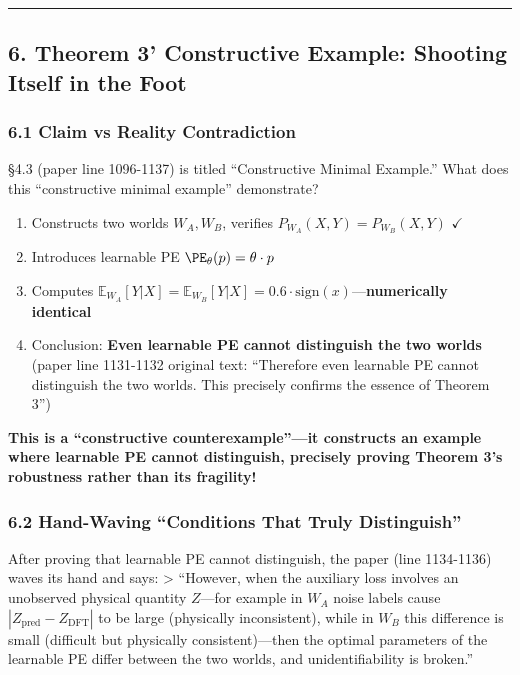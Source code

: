 \documentclass[
  12pt,
]{article}
\providecommand{\tightlist}{%
  \setlength{\itemsep}{0pt}\setlength{\parskip}{0pt}}
\begin{document}
\begin{center}\rule{0.5\linewidth}{0.5pt}\end{center}

\subsection{6. Theorem 3' Constructive Example: Shooting Itself in the Foot}\label{theorem-3-prime-example}

\subsubsection{6.1 Claim vs Reality Contradiction}\label{claim-vs-reality}

\S4.3 (paper line 1096-1137) is titled ``Constructive Minimal Example.'' What does this ``constructive minimal example'' demonstrate?

\begin{enumerate}
\def\labelenumi{\arabic{enumi}.}
\tightlist
\item
  Constructs two worlds \(W_A, W_B\), verifies \(P_{W_A}(X,Y) = P_{W_B}(X,Y)\) $\checkmark$
\item
  Introduces learnable PE \(\PE_\theta(p) = \theta \cdot p\)
\item
  Computes \(\mathbb{E}_{W_A}[Y|X] = \mathbb{E}_{W_B}[Y|X] = 0.6 \cdot \text{sign}(x)\)---\textbf{numerically identical}
\item
  Conclusion: \textbf{Even learnable PE cannot distinguish the two worlds} (paper line 1131-1132 original text: ``Therefore even learnable PE cannot distinguish the two worlds. This precisely confirms the essence of Theorem 3'')
\end{enumerate}

\textbf{This is a ``constructive counterexample''---it constructs an example where learnable PE cannot distinguish, precisely proving Theorem 3's robustness rather than its fragility!}

\subsubsection{6.2 Hand-Waving ``Conditions That Truly Distinguish''}\label{hand-waving}

After proving that learnable PE cannot distinguish, the paper (line 1134-1136) waves its hand and says:
\textgreater{} ``However, when the auxiliary loss involves an unobserved physical quantity \(Z\)---for example in \(W_A\) noise labels cause \(|Z_{\text{pred}} - Z_{\text{DFT}}|\) to be large (physically inconsistent), while in \(W_B\) this difference is small (difficult but physically consistent)---then the optimal parameters of the learnable PE differ between the two worlds, and unidentifiability is broken.''
\end{document}
